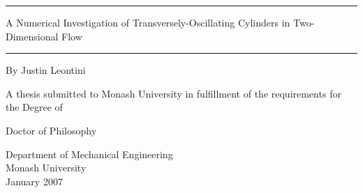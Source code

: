 \documentclass[11pt,titlepage,twoside,a4paper]{report}
\newcommand{\myclearpage}{\thispagestyle{empty}\cleartoevenpage\thispagestyle{empty}\cleartooddpage}
\begin{document}
\begin{titlepage}
\noindent\rule{\textwidth}{1.5pt}
\begin{flushright}
\LARGE
{\sc A Numerical Investigation of Transversely-Oscillating Cylinders in Two-Dimensional Flow} \\

\noindent\rule{\textwidth}{1.5pt}

\LARGE
\vspace{30mm}
{\sc By Justin Leontini}
\vspace{30mm}

\normalsize
{\sc A thesis submitted to Monash University in fulfillment of the requirements for the Degree of}

\vspace{5mm}
\LARGE
{\sc Doctor of Philosophy}

\vspace{15mm}
\normalsize
Department of Mechanical Engineering\\
Monash University\\
January 2007
\end{flushright}

\end{titlepage}

\myclearpage



\myclearpage

\myclearpage

\myclearpage

\myclearpage

\myclearpage
\tableofcontents
\newpage
\myclearpage
{}

\myclearpage



\end{document}
